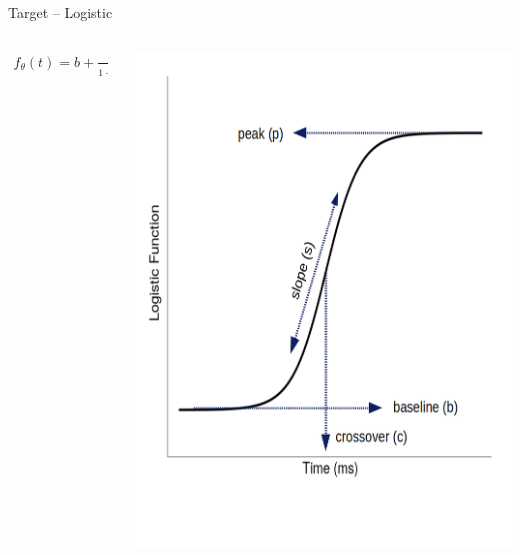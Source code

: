 \documentclass{beamer}
\begin{document}
\begin{frame}{Target -- Logistic}

\vspace{-5mm}

\begin{columns}
\begin{column}{0.45\textwidth}

\begin{align*}
f_{\theta}(t) = b + \frac{p-b}{1 + \exp \left( \frac{4s}{p-b} (c - t) \right)}
\end{align*}
\end{column}
\begin{column}{0.5\textwidth}  %
\begin{center}
\includegraphics[scale=0.3]{img/logistic_label.png}
\end{center}
\end{column}
\end{columns}
\end{frame}
\end{document}
